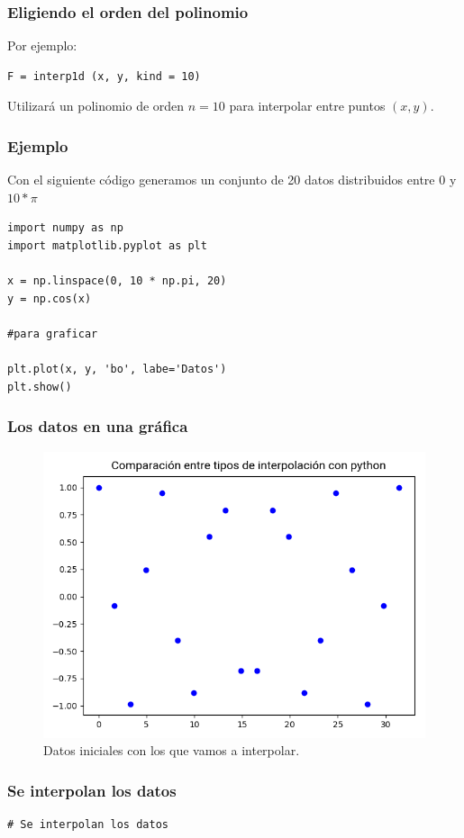 {\begin{frame}[fragile]
\end{frame}
\begin{frame}[fragile]
\frametitle{Eligiendo el orden del polinomio}
Por ejemplo:
\begin{lstlisting}[caption=Ejemplo de orden de polinomio, style= FormattedNumber, basicstyle=\linespread{0.9}\ttfamily=\small, columns=fullflexible]
F = interp1d (x, y, kind = 10)
\end{lstlisting}
Utilizará un polinomio de orden $n = 10$ para interpolar entre puntos $(x, y)$.
\end{frame}
\begin{frame}[fragile]
\frametitle{Ejemplo}
Con el siguiente código generamos un conjunto de 20 datos distribuidos entre $0$ y $10 * \pi$
\begin{lstlisting}[caption= Ejemplo para comparar el grado del polinomio de interpolación,style= FormattedNumber, basicstyle=\linespread{0.9}\ttfamily=\small, columns=fullflexible]
import numpy as np
import matplotlib.pyplot as plt

x = np.linspace(0, 10 * np.pi, 20)
y = np.cos(x)

#para graficar

plt.plot(x, y, 'bo', labe='Datos')
plt.show()
\end{lstlisting}
\end{frame}
\begin{frame}
\frametitle{Los datos en una gráfica}
\begin{figure}
\hspace*{-0.2cm}\includegraphics[scale=0.5]{Imagenes/interpolacion_01}
\caption{Datos iniciales con los que vamos a interpolar.}
\end{figure}
\end{frame}
\begin{frame}
\frametitle{Se interpolan los datos}
\begin{lstlisting}[caption=Cambiando el tipo de interpolación, style= FormattedNumber, basicstyle=\linespread{0.9}\ttfamily=\small, columns=fullflexible]
# Se interpolan los datos


\end{lstlisting}
\end{frame}}

